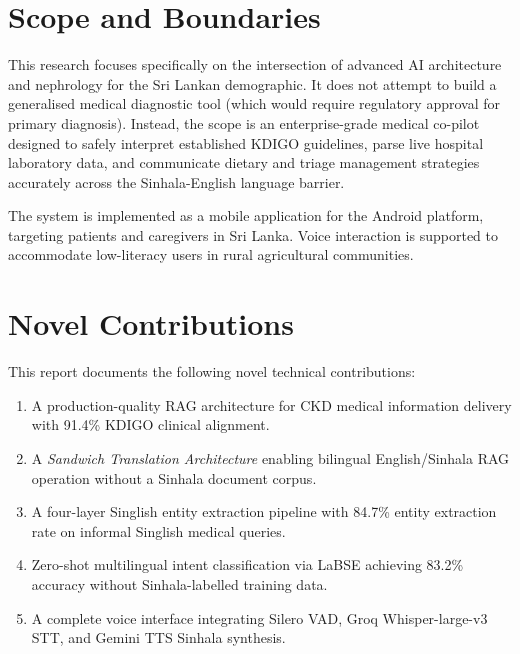 \documentclass[12pt,a4paper]{report}
\begin{document}
\section{Scope and Boundaries}
\label{sec:scope}

This research focuses specifically on the intersection of advanced AI architecture and nephrology for the Sri Lankan demographic. It does not attempt to build a generalised medical diagnostic tool (which would require regulatory approval for primary diagnosis). Instead, the scope is an enterprise-grade medical co-pilot designed to safely interpret established KDIGO guidelines, parse live hospital laboratory data, and communicate dietary and triage management strategies accurately across the Sinhala-English language barrier.

The system is implemented as a mobile application for the Android platform, targeting patients and caregivers in Sri Lanka. Voice interaction is supported to accommodate low-literacy users in rural agricultural communities.

\section{Novel Contributions}
\label{sec:contributions}

This report documents the following novel technical contributions:

\begin{enumerate}
  \item A production-quality RAG architecture for CKD medical information delivery with 91.4\% KDIGO clinical alignment.
  \item A \emph{Sandwich Translation Architecture} enabling bilingual English/Sinhala RAG operation without a Sinhala document corpus.
  \item A four-layer Singlish entity extraction pipeline with 84.7\% entity extraction rate on informal Singlish medical queries.
  \item Zero-shot multilingual intent classification via LaBSE achieving 83.2\% accuracy without Sinhala-labelled training data.
  \item A complete voice interface integrating Silero VAD, Groq Whisper-large-v3 STT, and Gemini TTS Sinhala synthesis.
\end{enumerate}
\end{document}
